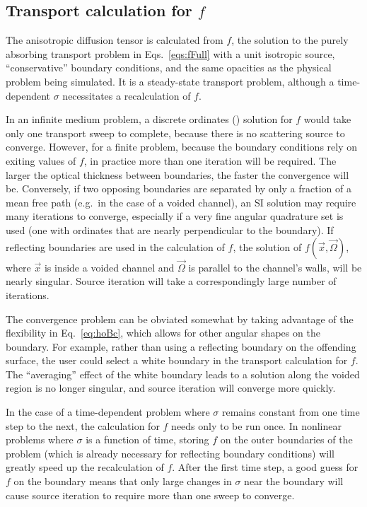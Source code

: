 \subsection{Transport calculation for \texorpdfstring{$f$}{f}}

The anisotropic diffusion tensor is calculated from $f$, the solution to the
purely absorbing transport problem in Eqs.~\eqref{eqs:fFull}  with a unit
isotropic source,
``conservative'' boundary conditions, and the same opacities as the physical problem
being simulated. It is a steady-state transport problem, although a
time-dependent $\sigma$ necessitates a recalculation of $f$.

In an infinite medium problem, a discrete ordinates (\SN)
solution for $f$ would take only one transport sweep to complete, because there
is no scattering source to converge. However, for a finite problem, because the boundary conditions
rely on exiting values of $f$, in practice more than one iteration will be
required. The
larger the optical thickness between boundaries, the faster the convergence will
be. Conversely, if
two opposing boundaries are separated by only a fraction of a mean free path
(e.g.\ in the case of a voided channel), an SI solution may require many
iterations to converge, especially if a very fine angular quadrature set is used
(one with ordinates that are nearly perpendicular to the boundary). If
reflecting boundaries are used in the calculation of $f$, the solution of
$f(\vec{x},\vec{\Omega})$, where $\vec{x}$ is inside a voided channel and
$\vec{\Omega}$ is parallel to the channel's walls, will be nearly singular.
Source iteration will take a correspondingly large number of iterations.

The convergence problem can be obviated somewhat by taking advantage of the
flexibility in Eq.~\eqref{eq:hoBc}, which allows for other angular shapes on the
boundary. For example, rather than using a reflecting boundary on the offending
surface, the user could select a white boundary in the transport calculation for
$f$. The ``averaging'' effect of the white boundary leads to a solution along
the voided region is no longer singular, and source iteration will converge more
quickly.

In the case of a time-dependent problem where $\sigma$ remains constant from one
time step to the next, the calculation for $f$ needs only to be run once. In
nonlinear problems where $\sigma$ is a function of time, storing $f$ on the
outer boundaries of the problem (which is already necessary for reflecting
boundary conditions) will greatly speed up the recalculation of $f$. After the
first time step, a good guess for $f$ on the boundary means that only
large changes in $\sigma$ near the boundary will cause source iteration to
require more than one sweep to converge.

